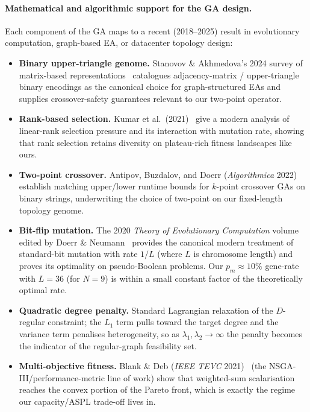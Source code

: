 \documentclass{article}
\begin{document}
    \paragraph{Mathematical and algorithmic support for the GA design.}
    \label{par:ga_support}
    Each component of the GA maps to a recent (2018--2025) result in evolutionary computation, graph-based EA, or datacenter topology design:
    \begin{itemize}
        \item \textbf{Binary upper-triangle genome.}  Stanovov \& Akhmedova's 2024 survey of matrix-based representations~\cite{stanovov2024matrix} catalogues adjacency-matrix / upper-triangle binary encodings as the canonical choice for graph-structured EAs and supplies crossover-safety guarantees relevant to our two-point operator.
        \item \textbf{Rank-based selection.}  Kumar et al.\ (2021)~\cite{kumar2021rank} give a modern analysis of linear-rank selection pressure and its interaction with mutation rate, showing that rank selection retains diversity on plateau-rich fitness landscapes like ours.
        \item \textbf{Two-point crossover.}  Antipov, Buzdalov, and Doerr (\emph{Algorithmica} 2022)~\cite{antipov2022fast} establish matching upper/lower runtime bounds for $k$-point crossover GAs on binary strings, underwriting the choice of two-point on our fixed-length topology genome.
        \item \textbf{Bit-flip mutation.}  The 2020 \emph{Theory of Evolutionary Computation} volume edited by Doerr \& Neumann~\cite{doerr2020theory} provides the canonical modern treatment of standard-bit mutation with rate $1/L$ (where $L$ is chromosome length) and proves its optimality on pseudo-Boolean problems.  Our $p_m\approx 10\%$ gene-rate with $L = 36$ (for $N=9$) is within a small constant factor of the theoretically optimal rate.
        \item \textbf{Quadratic degree penalty.}  Standard Lagrangian relaxation of the $D$-regular constraint; the $L_1$ term pulls toward the target degree and the variance term penalises heterogeneity, so as $\lambda_1,\lambda_2 \to \infty$ the penalty becomes the indicator of the regular-graph feasibility set.
        \item \textbf{Multi-objective fitness.}  Blank \& Deb (\emph{IEEE TEVC} 2021)~\cite{blank2021running} (the NSGA-III/performance-metric line of work) show that weighted-sum scalarisation reaches the convex portion of the Pareto front, which is exactly the regime our capacity/ASPL trade-off lives in.

\end{itemize}
\end{document}

